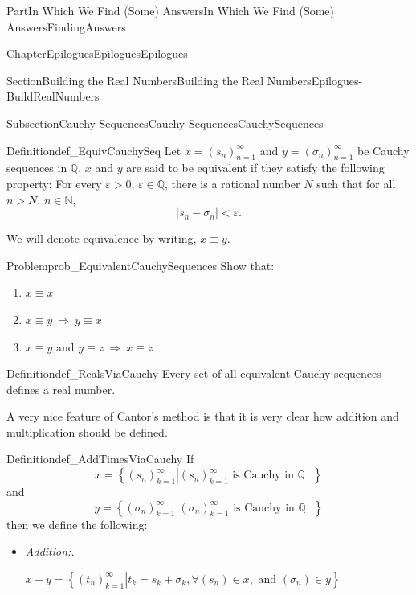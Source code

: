 \documentclass[oneside,10pt,]{book}
\newcommand{\lititle}[1]{{\slshape#1}}
\numberwithin{equation}{part}
\newcommand{\imp}{\ \Rightarrow\ }
\newcommand{\abs}[1]{\left|#1\right|}
\newcommand{\eps}{\varepsilon}
\newcommand{\QQ}{\mathbb {Q}}
\newcommand{\NN}{\mathbb {N}}
\newcommand{\lt}{<}
\begin{document}
\begin{partptx}{Part}{In Which We Find (Some) Answers}{}{In Which We Find (Some) Answers}{}{}{FindingAnswers}
\begin{chapterptx}{Chapter}{Epilogues}{}{Epilogues}{}{}{Epilogues}
\begin{sectionptx}{Section}{Building the Real Numbers}{}{Building the Real Numbers}{}{}{Epilogues-BuildRealNumbers}
\begin{subsectionptx}{Subsection}{Cauchy Sequences}{}{Cauchy Sequences}{}{}{CauchySequences}
\begin{definition}{Definition}{}{def_EquivCauchySeq}
Let \(x=\left(s_n\right)_{n=1}^\infty\) and \(y=\left(\sigma_n\right)_{n=1}^\infty\) be Cauchy sequences in \(\QQ\).  \(x\) and \(y\) are said to be equivalent if they satisfy the following property: For every \(\eps>0\), \(\eps\in\QQ\), there is a rational number \(N\) such that for all \(n>N\), \(n\in\NN\),%
\begin{equation*}
\abs{s_n-\sigma_n}\lt \eps\text{.}
\end{equation*}
%
\par
We will denote equivalence by writing, \(x\equiv y\).%
\end{definition}
\begin{problem}{Problem}{}{prob_EquivalentCauchySequences}%
Show that:%
\begin{enumerate}[font=\bfseries,label=(\alph*),ref=\alph*]%
\item{}\(x\equiv x\)%
\item{}\(x\equiv y \imp y\equiv x\)%
\item{}\(x\equiv y\) and \(y\equiv z \imp x\equiv z\)%
\end{enumerate}%
\end{problem}
\begin{definition}{Definition}{}{def_RealsViaCauchy}%
%
Every set of all equivalent Cauchy sequences defines a real number.%
\end{definition}
A very nice feature of Cantor's method is that it is very clear how addition and multiplication should be defined.%
\begin{definition}{Definition}{}{def_AddTimesViaCauchy}%
 If%
\begin{equation*}
x= \left\{\left.\left(s_n\right)_{k=1}^\infty \right| \left(s_n\right)_{k=1}^\infty \text{ is Cauchy in \(\QQ\) } \right\}
\end{equation*}
and%
\begin{equation*}
y= \left\{\left.\left(\sigma_n\right)_{k=1}^\infty \right| \left(\sigma_n\right)_{k=1}^\infty \text{ is Cauchy in \(\QQ\) } \right\}
\end{equation*}
then we define the following:%
\begin{itemize}[label=\textbullet]
\item{}\lititle{Addition:.}\par%
\(\displaystyle x+y = \left\{\left.\left(t_n\right)_{k=1}^\infty \right| t_k = s_k+\sigma_k, \forall (s_n) \in x, \text{ and } (\sigma_n)\in y\right\}\)%

\end{itemize}
\end{definition}
\end{subsectionptx}
\end{sectionptx}
\end{chapterptx}
\end{partptx}
\end{document}
